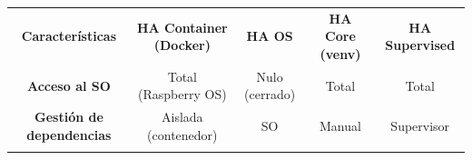 \begin{table}[H]
    \centering
    \setlength{\tabcolsep}{3pt}
    \renewcommand{\arraystretch}{1.2}
    \begin{tabular}{|c|c|c|c|c|}
        \hhline{|-|-|-|-|-|}
        \rowcolor[gray]{0.9} 
        \parbox[c]{4.5cm}{\vspace{0.2cm}\centering\textbf{Características}\vspace{0.2cm}} & \parbox[c]{2.4cm}{\vspace{0.2cm}\centering\textbf{HA Container (Docker)}\vspace{0.2cm}} & \parbox[c]{1.9cm}{\vspace{0.2cm}\centering\textbf{HA OS}\vspace{0.2cm}} & \parbox[c]{2.4cm}{\vspace{0.2cm}\centering\textbf{HA Core (venv)}\vspace{0.2cm}} & \parbox[c]{2.2cm}{\vspace{0.2cm}\centering\textbf{HA Supervised}\vspace{0.2cm}} \\ \hhline{|-|-|-|-|-|}
        \parbox[c]{4.5cm}{\vspace{0.2cm}\centering\textbf{Acceso al SO}\vspace{0.2cm}} & \parbox[c]{2.4cm}{\vspace{0.2cm}\centering Total (Raspberry OS)\vspace{0.2cm}} & \parbox[c]{1.9cm}{\vspace{0.2cm}\centering Nulo (cerrado)\vspace{0.2cm}} & \parbox[c]{2.4cm}{\vspace{0.2cm}\centering Total\vspace{0.2cm}} & \parbox[c]{2.2cm}{\vspace{0.2cm}\centering Total\vspace{0.2cm}} \\ \hhline{|-|-|-|-|-|}
        \parbox[c]{4.5cm}{\vspace{0.2cm}\centering\textbf{Gestión de dependencias}\vspace{0.2cm}} & \parbox[c]{2.4cm}{\vspace{0.2cm}\centering Aislada (contenedor)\vspace{0.2cm}} & \parbox[c]{1.9cm}{\vspace{0.2cm}\centering SO\vspace{0.2cm}} & \parbox[c]{2.4cm}{\vspace{0.2cm}\centering Manual\vspace{0.2cm}} & \parbox[c]{2.2cm}{\vspace{0.2cm}\centering Supervisor\vspace{0.2cm}} \\ \hhline{|-|-|-|-|-|}

\end{tabular}
\end{table}

